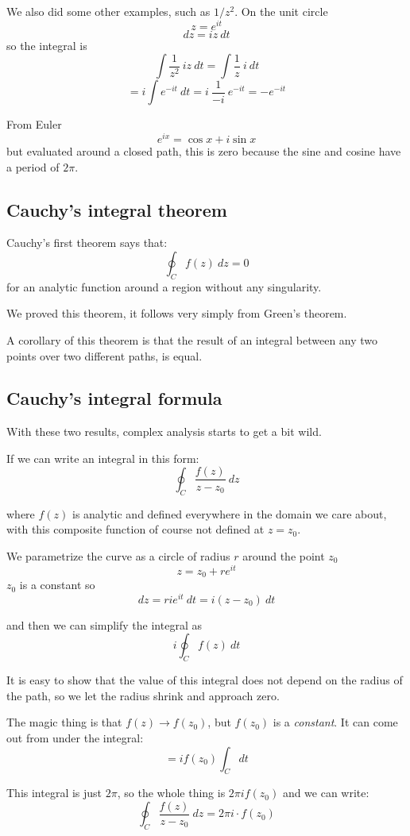 \documentclass[11pt, oneside]{article}
\begin{document}
We also did some other examples, such as $1/z^2$.  On the unit circle
\[ z = e^{it} \]
\[ dz = iz \ dt \]
so the integral is
\[ \int \frac{1}{z^2} \ iz \ dt = \int \frac{1}{z} \ i \ dt \]
\[ = i \int e^{-it} \ dt = i \ \frac{1}{-i} \ e^{-it} = - e^{-it} \]

From Euler
\[ e^{ix} = \cos x + i \sin x \]
but evaluated around a closed path, this is zero because the sine and cosine have a period of $2 \pi$.

\subsection*{Cauchy's integral theorem}

Cauchy's first theorem says that:
\[ \oint_C f(z) \ dz = 0 \] 
for an analytic function around a region without any singularity.

We proved this theorem, it follows very simply from Green's theorem.

A corollary of this theorem is that the result of an integral between any two points over two different paths, is equal.

\subsection*{Cauchy's integral formula}

With these two results, complex analysis starts to get a bit wild.  

If we can write an integral in this form:
\[ \oint_{C} \frac{f(z)}{z-z_0} \ dz \]

where $f(z)$ is analytic and defined everywhere in the domain we care about, with this composite function of course not defined at $z = z_0$.

We parametrize the curve as a circle of radius $r$ around the point $z_0$
\[ z = z_0 + re^{it} \]
$z_0$ is a constant so
\[ dz = ri e^{it} \ dt =  i(z-z_0) \ dt \] 

and then we can simplify the integral as
\[ i \oint_{C} f(z) \ dt \]

It is easy to show that the value of this integral does not depend on the radius of the path, so we let the radius shrink and approach zero.  

The magic thing is that $f(z) \rightarrow f(z_0)$, but $f(z_0)$ is a \emph{constant}.  It can come out from under the integral:
\[ = i f(z_0) \int_{C} dt \]

This integral is just $2\pi$, so the whole thing is $2 \pi i f(z_0)$ and we can write:
\[ \oint_C \frac{f(z)}{z-z_0} \ dz = 2 \pi i \cdot f(z_0) \]
\end{document}
